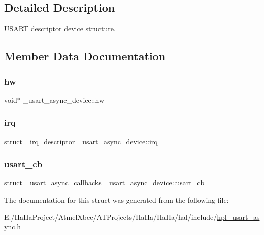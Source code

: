 \subsection{Detailed Description}
U\+S\+A\+RT descriptor device structure. 

\subsection{Member Data Documentation}
\mbox{\label{struct__usart__async__device_a3eae9af22755ddfe25f8406c2939262f}} 
\subsubsection{\texorpdfstring{hw}{hw}}
{\footnotesize\ttfamily void$\ast$ \+\_\+usart\+\_\+async\+\_\+device\+::hw}

\mbox{\label{struct__usart__async__device_a0eb2cf8aa3661fe0a22168429c04bf57}} 
\subsubsection{\texorpdfstring{irq}{irq}}
{\footnotesize\ttfamily struct \hyperlink{struct__irq__descriptor}{\+\_\+irq\+\_\+descriptor} \+\_\+usart\+\_\+async\+\_\+device\+::irq}

\mbox{\label{struct__usart__async__device_af36f1abd8113ed4a2f06a9084519f369}} 
\subsubsection{\texorpdfstring{usart\+\_\+cb}{usart\_cb}}
{\footnotesize\ttfamily struct \hyperlink{struct__usart__async__callbacks}{\+\_\+usart\+\_\+async\+\_\+callbacks} \+\_\+usart\+\_\+async\+\_\+device\+::usart\+\_\+cb}



The documentation for this struct was generated from the following file\+:\begin{DoxyCompactItemize}
\item 
E\+:/\+Ha\+Ha\+Project/\+Atmel\+Xbee/\+A\+T\+Projects/\+Ha\+Ha/\+Ha\+Ha/hal/include/\hyperlink{hpl__usart__async_8h}{hpl\+\_\+usart\+\_\+async.\+h}\end{DoxyCompactItemize}

